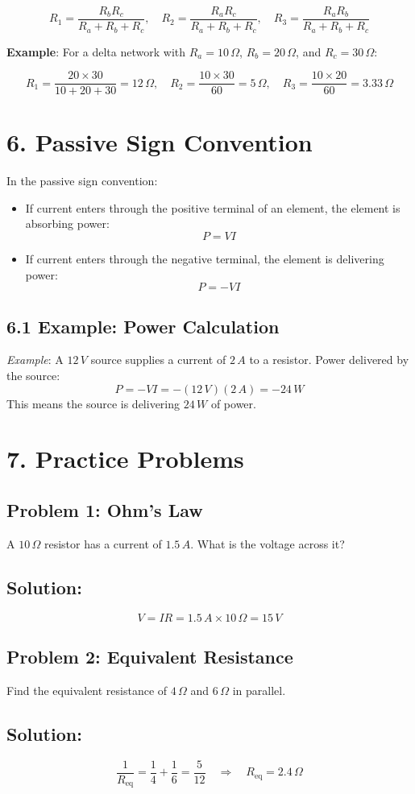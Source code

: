 \documentclass[10pt]{article}
\begin{document}
\begin{multicols}{2}
\[
R_1 = \frac{R_b R_c}{R_a + R_b + R_c}, \quad 
R_2 = \frac{R_a R_c}{R_a + R_b + R_c}, \quad 
R_3 = \frac{R_a R_b}{R_a + R_b + R_c}
\]

\textbf{Example}: For a delta network with \(R_a = 10\,\Omega\), \(R_b = 20\,\Omega\), and \(R_c = 30\,\Omega\):

\[
R_1 = \frac{20 \times 30}{10 + 20 + 30} = 12\,\Omega, \quad 
R_2 = \frac{10 \times 30}{60} = 5\,\Omega, \quad 
R_3 = \frac{10 \times 20}{60} = 3.33\,\Omega
\]
\normalsize %
\vspace{1em} %

\section*{6. Passive Sign Convention}
In the passive sign convention:
\begin{itemize}
    \item If current enters through the positive terminal of an element, the element is absorbing power:
    \[
    P = VI
    \]
    \item If current enters through the negative terminal, the element is delivering power:
    \[
    P = -VI
    \]
\end{itemize}

\subsection*{6.1 Example: Power Calculation}
\textit{Example}: A \(12\,V\) source supplies a current of \(2\,A\) to a resistor. Power delivered by the source:
\[
P = -VI = -(12 \,V)(2\,A) = -24\,W
\]
This means the source is delivering \(24\,W\) of power.

\section*{7. Practice Problems}

\subsection*{Problem 1: Ohm's Law}
A \(10\,\Omega\) resistor has a current of \(1.5\,A\). What is the voltage across it?

\subsection*{Solution:}
\[
V = IR = 1.5 \,A \times 10\, \Omega = 15\,V
\]

\subsection*{Problem 2: Equivalent Resistance}
Find the equivalent resistance of \(4\,\Omega\) and \(6\,\Omega\) in parallel.

\subsection*{Solution:}
\[
\frac{1}{R_{\text{eq}}} = \frac{1}{4} + \frac{1}{6} = \frac{5}{12} \quad \Rightarrow \quad R_{\text{eq}} = 2.4\,\Omega
\]

\end{multicols}
\end{document}
